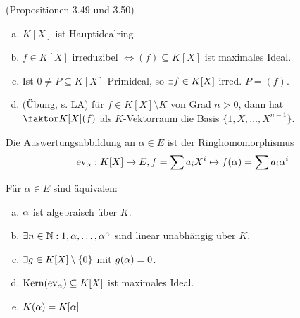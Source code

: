\documentclass[a4paper]{report}
\begin{document}
\begin{whg} (Propositionen 3.49 und 3.50)
  \begin{enumerate}[(a)]
    \item $K[X]$ ist Hauptidealring.
    \item $f \in K[X]$ irreduzibel $\iff (f) \subseteq K[X]$ ist maximales Ideal.
    \item Ist $0 \ne P \subseteq K[X]$ Primideal, so $\exists f \in K[X]$ irred. $P = (f)$.
    \item (Übung, s. LA) für $f \in K[X] \setminus K$ von Grad $n > 0$, dann hat $\fak {K[X]}{(f)}$ als $K$-Vektorraum die Basis $\{1, X, \ldots, X^{n-1}\}$.
  \end{enumerate}
\end{whg}
\begin{defi*}
  Die Auswertungsabbildung an $\alpha \in E$ ist der Ringhomomorphismus
  \[\operatorname{ev}_{\alpha} : K[X] \to E, f = \sum a_{i}X^{i} \mapsto f(\alpha) = \sum a_{i} \alpha^{i}\]
\end{defi*}
\begin{satz}
  Für $\alpha \in E$ sind äquivalen:
  \begin{enumerate}[(a)]
    \item $\alpha$ ist algebraisch über $K$.
    \item $\exists n \in \mathbb{N} : 1, \alpha, \ldots, \alpha^{n}$ sind linear unabhängig über $K$.
    \item $\exists g \in K[X] \setminus \{0\}$ mit $g(\alpha) = 0$.
    \item $\operatorname{Kern}(\operatorname{ev}_{\alpha}) \subseteq K[X]$ ist maximales Ideal.
    \item $K(\alpha) = K[\alpha]$.
  \end{enumerate}
\end{satz}
\end{document}
